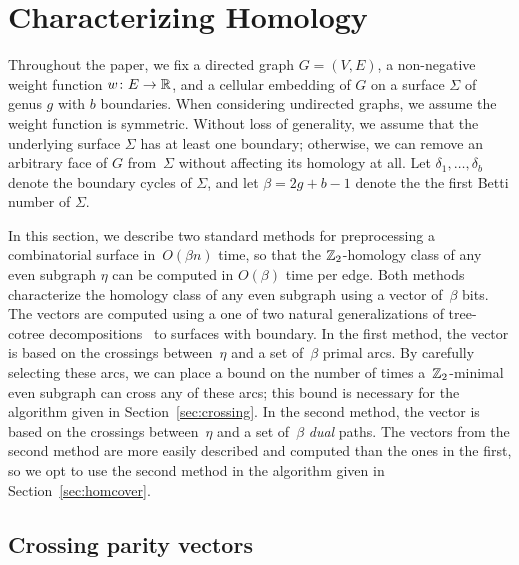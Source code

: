 \section{Characterizing Homology}
\label{sec:characterizing}

Throughout the paper, we fix a directed graph $G=(V,E)$, a non-negative weight function $w\colon E\to \mathbb{R}$, and a cellular embedding of $G$ on a surface $\Sigma$ of genus $g$ with $b$ boundaries.
When considering undirected graphs, we assume the weight function is symmetric.
Without loss of generality, we assume that the underlying surface $\Sigma$ has at least one boundary; otherwise, we can remove an arbitrary face of $G$ from~$\Sigma$ without affecting its homology at all.  Let $\delta_1, \dots, \delta_b$ denote the boundary cycles of $\Sigma$, and let $\beta = 2g+b-1$ denote the the first Betti number of $\Sigma$.

In this section, we describe two standard methods for preprocessing a combinatorial surface in~$O(\beta n)$ time, so that the $\mathbb{Z}_2$-homology class of any even subgraph $\eta$ can be computed in $O(\beta)$ time per edge.
Both methods characterize the homology class of any even subgraph using a vector of~$\beta$ bits.
The vectors are computed using a one of two natural generalizations of tree-cotree decompositions~\cite{e-dgteg-03} to surfaces with boundary.
In the first method, the vector is based on the crossings between~$\eta$ and a set of~$\beta$ primal arcs.
By carefully selecting these arcs, we can place a bound on the number of times a~$\mathbb{Z}_2$-minimal even subgraph can cross any of these arcs; this bound is necessary for the algorithm given in Section~\ref{sec:crossing}.
In the second method, the vector is based on the crossings between~$\eta$ and a set of~$\beta$ \emph{dual} paths.
The vectors from the second method are more easily described and computed than the ones in the first, so we opt to use the second method in the algorithm given in Section~\ref{sec:homcover}.



\subsection{Crossing parity vectors}
\label{sec:characterizing_crossings}

